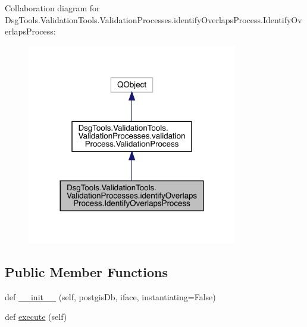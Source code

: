 Collaboration diagram for Dsg\+Tools.\+Validation\+Tools.\+Validation\+Processes.\+identify\+Overlaps\+Process.\+Identify\+Overlaps\+Process\+:
\nopagebreak
\begin{figure}[H]
\begin{center}
\leavevmode
\includegraphics[width=260pt]{class_dsg_tools_1_1_validation_tools_1_1_validation_processes_1_1identify_overlaps_process_1_1_iff6dd356f0622a791f2b139b8b921d41}
\end{center}
\end{figure}
\subsection*{Public Member Functions}
\begin{DoxyCompactItemize}
\item 
def \mbox{\hyperlink{class_dsg_tools_1_1_validation_tools_1_1_validation_processes_1_1identify_overlaps_process_1_1_identify_overlaps_process_aac908a84b6d40c791c6cc7f6ac266654}{\+\_\+\+\_\+init\+\_\+\+\_\+}} (self, postgis\+Db, iface, instantiating=False)
\item 
def \mbox{\hyperlink{class_dsg_tools_1_1_validation_tools_1_1_validation_processes_1_1identify_overlaps_process_1_1_identify_overlaps_process_a69456bac9b693988550669bd20cd32de}{execute}} (self)
\end{DoxyCompactItemize}
